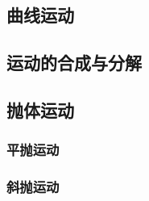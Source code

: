 
\begin{issues}
\issueDraft
\issueTODO
\end{issues}

\subsection{曲线运动}

\subsection{运动的合成与分解}

\subsection{抛体运动}

\subsubsection{平抛运动}

\subsubsection{斜抛运动}
